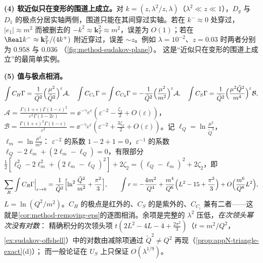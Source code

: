 \begin{example}
\textbf{(4) 软近似只在变形的围道上成立。}对 $k=(z,\lambda^2/z,\lambda)$（$\lambda^2\ll z\ll1$），$D_g$ 与 $D_1$ 的极点分居实轴两侧，围道只能在其间穿过实轴。若在 $k^-\approx0$ 处穿过，$|e_1|\approx m^2$
而被删去的 $-k^2\approx\mathbf k_T^2\approx m^2$，误差为 $O(1)$；若在 $\Real k^-\approx\mathbf k_T^2/(4k^+)$ 附近穿过，误差 $\sim z$。例如 $\lambda=10^{-2}$、$z=0.03$ 时两者分别为 $0.958$ 与 $0.036$
（\cref{fig:method-sudakov-plane}）。%
这是“近似只在变形的围道上成立”的最简单实例。

\textbf{(5) 值与极点相消。}
\begin{equation}\label{eq:method-tri-values}
\int C_H\Gamma=\frac{1}{\tilde Q^2}\Bigl(\frac{\mu^2}{\tilde Q^2}\Bigr)^{\varepsilon}\mathcal A,\quad
\int C_{C_1}\Gamma=\int C_{C_2}\Gamma=-\frac{1}{\tilde Q^2}\Bigl(\frac{\mu^2}{m^2}\Bigr)^{\varepsilon}\mathcal A,\quad
\int C_S\Gamma=\frac{1}{\tilde Q^2}\Bigl(\frac{\mu^2\tilde Q^2}{m^4}\Bigr)^{\varepsilon}\mathcal B,
\end{equation}
$\mathcal A=\frac{\Gamma(1+\varepsilon)\Gamma(1-\varepsilon)^2}{\varepsilon^2\Gamma(1-2\varepsilon)}=\ee^{-\gamma_E\varepsilon}(\varepsilon^{-2}-\frac{\zeta_2}2+O(\varepsilon))$，
$\mathcal B=\frac{\Gamma(1+\varepsilon)^2\Gamma(1-\varepsilon)}{\varepsilon^2}=\ee^{-\gamma_E\varepsilon}(\varepsilon^{-2}+\frac{3\zeta_2}2+O(\varepsilon))$。记 $\ell_Q=\ln\frac{\mu^2}{\tilde Q^2}$，$\ell_m=\ln\frac{\mu^2}{m^2}$：
$\varepsilon^{-2}$ 的系数 $1-2+1=0$，$\varepsilon^{-1}$ 的系数 $\ell_Q-2\ell_m+(2\ell_m-\ell_Q)=0$，有限部分 $\frac12[\ell_Q^2-2\ell_m^2+(2\ell_m-\ell_Q)^2]+2\zeta_2=(\ell_Q-\ell_m)^2+2\zeta_2$，即
\begin{equation}\label{eq:method-tri-sum}
\sum_R\int C_R\Gamma\Big|_{\varepsilon\to0}=\frac1{\tilde Q^2}\Bigl[\ln^2\frac{\tilde Q^2}{m^2}+\frac{\pi^2}3\Bigr],\qquad
\int r=-\frac{4m^2}{Q^4}+\frac{m^4}{Q^6}\Bigl(L^2-15+\frac{\pi^2}3\Bigr)+O\Bigl(\frac{m^6}{Q^8}L^2\Bigr),
\end{equation}
$L=\ln(Q^2/m^2)$。$C_H$ 的极点是红外的、$C_S$ 的是紫外的、$C_{C_i}$ 兼有二者——这就是\cref{cor:method-removing-eps}的逐图相消。余项是完整的 $\lambda^2$ 压低，\emph{在次领头幂次没有对数}：
精确积分的次领头项 $t(2L^2-4L-4+\frac{2\pi^2}3)$（$t=m^2/Q^2$，\cref{ex:sudakov-offshell}）中的对数由减除项通过 $\tilde Q^2\ne Q^2$ 再现（\cref{prop:appN-triangle-exact}(d)）；
而一般论证在 $U_S$ 上只保证 $O(\lambda^{1/9})$。


\end{example}
